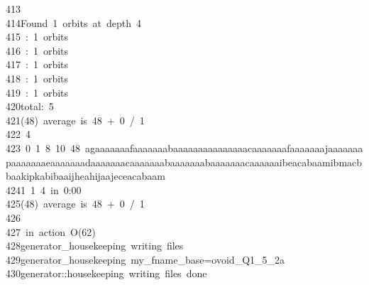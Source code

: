 \begin{tabbing}
413\>\\[0pt]
414\>Found\ 1\ orbits\ at\ depth\ 4\\[0pt]
415\ :\ 1\ orbits\\[0pt]
416\ :\ 1\ orbits\\[0pt]
417\ :\ 1\ orbits\\[0pt]
418\ :\ 1\ orbits\\[0pt]
419\ :\ 1\ orbits\\[0pt]
420\>total:\ 5\\[0pt]
421\>(48)\ average\ is\ 48\ +\ 0\ /\ 1\\[0pt]
422\>\ 4\\[0pt]
423\ 0\ 1\ 8\ 10\ 48\ agaaaaaaafaaaaaaabaaaaaaaaaaaaaaacaaaaaaafaaaaaaajaaaaaaapaaaaaaaeaaaaaaadaaaaaaacaaaaaaabaaaaaaabaaaaaaacaaaaaaibeacabaamibmacbbaakipkabibaaijheahijaajeceacabaam\\[0pt]
424\>1\ 1\ 4\ in\ 0:00\\[0pt]
425\>(48)\ average\ is\ 48\ +\ 0\ /\ 1\\[0pt]
426\>\\[0pt]
427\>\ in\ action\ O(62)\\[0pt]
428\>generator\_housekeeping\ writing\ files\\[0pt]
429\>generator\_housekeeping\ my\_fname\_base=ovoid\_Q1\_5\_2a\\[0pt]
430\>generator::housekeeping\ writing\ files\ done\\[0pt]

\end{tabbing}
